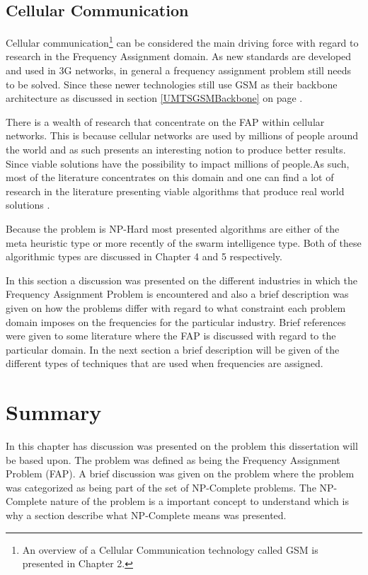 \subsection{Cellular Communication}
Cellular communication\footnote{An overview of a Cellular Communication technology called GSM is presented in Chapter 2.} can be considered the main driving force with regard to research in the Frequency Assignment domain. As new standards are developed and used in 3G networks, in general a frequency assignment problem still needs to be solved. Since these newer technologies still use GSM as their backbone architecture as discussed in section \ref{UMTSGSMBackbone} on page \pageref{UMTSGSMBackbone}.

There is a wealth of research that concentrate on the FAP within cellular networks. This is because cellular networks are used by millions of people around the world and as such presents an interesting notion to produce better results. Since viable solutions have the possibility to impact millions of people.As such, most of the literature concentrates on this domain and one can find a lot of research in the literature presenting viable algorithms that produce real world solutions \cite{Eisenblatter}. 

Because the problem is NP-Hard most presented algorithms are either of the meta heuristic type or more recently of the swarm intelligence type. Both of these algorithmic types are discussed in Chapter 4 and 5 respectively.

In this section a discussion was presented on the different industries in which the Frequency Assignment Problem is encountered and also a brief description was given on how the problems differ with regard to what constraint each problem domain imposes on the frequencies for the particular industry. 
Brief references were given to some literature where the FAP is discussed with regard to the particular domain. In the next section a brief description will be given of the different types of techniques that are used when frequencies are assigned.
\section{Summary}
In this chapter has discussion was presented on the problem this dissertation will be based upon. The problem was defined as being the Frequency Assignment Problem (FAP). A brief discussion was given on the problem where the problem was categorized as being part of the set of NP-Complete problems. The NP-Complete nature of the problem is a important concept to understand which is why a section describe what NP-Complete means was presented.

